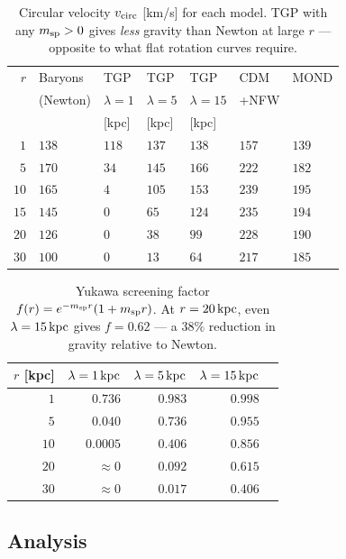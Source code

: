 \begin{table}[h]
\centering
\caption{Circular velocity $v_{\rm circ}$ [km/s] for each model.
TGP with any $m_{\rm sp}>0$ gives \emph{less} gravity than Newton at
large $r$ — opposite to what flat rotation curves require.}
\label{tab:rotation_curve}
\begin{tabular}{rllllll}
\hline
$r$ & Baryons & TGP & TGP & TGP & CDM & MOND \\
[kpc] & (Newton) & $\lambda=1$ & $\lambda=5$ & $\lambda=15$ & +NFW & \\
& & [kpc] & [kpc] & [kpc] & & \\
\hline
$ 1$ & $138$ & $118$ & $137$ & $138$ & $157$ & $139$ \\
$ 5$ & $170$ & $ 34$ & $145$ & $166$ & $222$ & $182$ \\
$10$ & $165$ & $  4$ & $105$ & $153$ & $239$ & $195$ \\
$15$ & $145$ & $  0$ & $ 65$ & $124$ & $235$ & $194$ \\
$20$ & $126$ & $  0$ & $ 38$ & $ 99$ & $228$ & $190$ \\
$30$ & $100$ & $  0$ & $ 13$ & $ 64$ & $217$ & $185$ \\
\hline
\end{tabular}
\end{table}

\begin{table}[h]
\centering
\caption{Yukawa screening factor $f(r)=e^{-m_{\rm sp}r}(1+m_{\rm sp}r)$.
At $r=20\,{\rm kpc}$, even $\lambda=15\,{\rm kpc}$ gives $f=0.62$ —
a $38\%$ reduction in gravity relative to Newton.}
\label{tab:yukawa_screening}
\begin{tabular}{rrrrr}
\hline
$r$ [kpc] & $\lambda=1\,{\rm kpc}$ & $\lambda=5\,{\rm kpc}$ &
$\lambda=15\,{\rm kpc}$ \\
\hline
$ 1$ & $0.736$ & $0.983$ & $0.998$ \\
$ 5$ & $0.040$ & $0.736$ & $0.955$ \\
$10$ & $0.0005$ & $0.406$ & $0.856$ \\
$20$ & $\approx0$ & $0.092$ & $0.615$ \\
$30$ & $\approx0$ & $0.017$ & $0.406$ \\
\hline
\end{tabular}
\end{table}

\subsection{Analysis}

